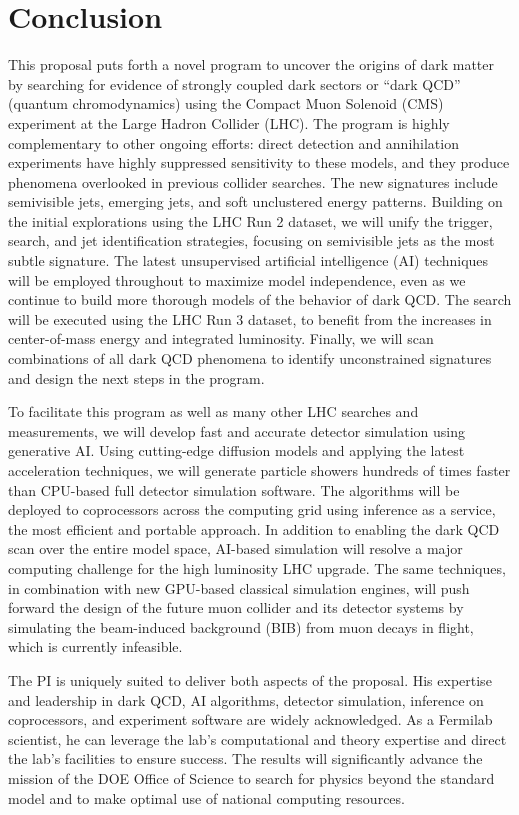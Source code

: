 \section{Conclusion}\label{sec:conclusion}

This proposal puts forth a novel program to uncover the origins of dark matter
by searching for evidence of strongly coupled dark sectors or ``dark QCD'' (quantum chromodynamics)
using the Compact Muon Solenoid (CMS) experiment at the Large Hadron Collider (LHC).
The program is highly complementary to other ongoing efforts:
direct detection and annihilation experiments have highly suppressed sensitivity to these models,
and they produce phenomena overlooked in previous collider searches.
The new signatures include semivisible jets, emerging jets, and soft unclustered energy patterns.
Building on the initial explorations using the LHC Run 2 dataset,
we will unify the trigger, search, and jet identification strategies,
focusing on semivisible jets as the most subtle signature.
The latest unsupervised artificial intelligence (AI) techniques will be employed throughout to maximize model independence,
even as we continue to build more thorough models of the behavior of dark QCD.
The search will be executed using the LHC Run 3 dataset,
to benefit from the increases in center-of-mass energy and integrated luminosity.
Finally, we will scan combinations of all dark QCD phenomena to identify unconstrained signatures
and design the next steps in the program.

To facilitate this program as well as many other LHC searches and measurements,
we will develop fast and accurate detector simulation using generative AI.
Using cutting-edge diffusion models and applying the latest acceleration techniques,
we will generate particle showers hundreds of times faster than CPU-based full detector simulation software.
The algorithms will be deployed to coprocessors across the computing grid using inference as a service,
the most efficient and portable approach.
In addition to enabling the dark QCD scan over the entire model space,
AI-based simulation will resolve a major computing challenge for the high luminosity LHC upgrade.
The same techniques, in combination with new GPU-based classical simulation engines,
will push forward the design of the future muon collider and its detector systems
by simulating the beam-induced background (BIB) from muon decays in flight, which is currently infeasible.

The PI is uniquely suited to deliver both aspects of the proposal.
His expertise and leadership in dark QCD, AI algorithms, detector simulation, inference on coprocessors, and experiment software are widely acknowledged.
As a Fermilab scientist, he can leverage the lab's computational and theory expertise and direct the lab's facilities to ensure success.
The results will significantly advance the mission of the DOE Office of Science to search for physics beyond the standard model and to make optimal use of national computing resources.

